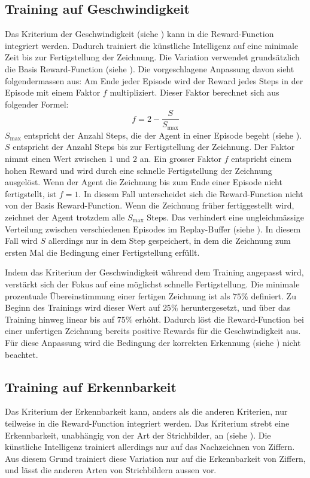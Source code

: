 \subsection{Training auf Geschwindigkeit}\label{sub:m_var_speed}
Das Kriterium der Geschwindigkeit (siehe ) kann in
die Reward-Function integriert werden. Dadurch trainiert die künstliche
Intelligenz auf eine minimale Zeit bis zur Fertigstellung der Zeichnung. Die
Variation verwendet grundsätzlich die Basis Reward-Function (siehe
). Die vorgeschlagene Anpassung davon sieht
folgendermassen aus: Am Ende jeder Episode wird der Reward jedes Steps in der
Episode mit einem Faktor $f$ multipliziert. Dieser Faktor berechnet sich aus
folgender Formel:
\[ f = 2 - \frac{S}{S_{\max}} \]
$S_{\max}$ entspricht der Anzahl Steps, die der Agent in einer Episode begeht
(siehe ). $S$ entspricht der Anzahl Steps bis zur
Fertigstellung der Zeichnung. Der Faktor nimmt einen Wert zwischen $1$ und $2$
an. Ein grosser Faktor $f$ entspricht einem hohen Reward und wird durch eine
schnelle Fertigstellung der Zeichnung ausgelöst. Wenn der Agent die Zeichnung
bis zum Ende einer Episode nicht fertigstellt, ist $f = 1$. In diesem Fall unterscheidet sich die
Reward-Function nicht von der Basis Reward-Function. Wenn die Zeichnung früher
fertiggestellt wird, zeichnet der Agent trotzdem alle $S_{\max}$ Steps. Das
verhindert eine ungleichmässige Verteilung zwischen verschiedenen Episodes im
Replay-Buffer (siehe ). In diesem Fall wird $S$
allerdings nur in dem Step gespeichert, in dem die Zeichnung zum ersten Mal die
Bedingung einer Fertigstellung erfüllt.  
 
Indem das Kriterium der Geschwindigkeit während dem Training angepasst wird,
verstärkt sich der Fokus auf eine möglichst schnelle Fertigstellung. Die
minimale prozentuale Übereinstimmung einer fertigen Zeichnung ist als $75\%$
definiert. Zu Beginn des Trainings wird dieser Wert auf $25\%$ heruntergesetzt,
und über das Training hinweg linear bis auf $75\%$ erhöht. Dadurch löst die
Reward-Function bei einer unfertigen Zeichnung bereits positive Rewards für die
Geschwindigkeit aus. Für diese Anpassung wird die Bedingung der korrekten
Erkennung (siehe ) nicht beachtet.
 
 
\subsection{Training auf Erkennbarkeit}\label{sub:m_var_rec}
Das Kriterium der Erkennbarkeit kann, anders als die anderen Kriterien, nur
teilweise in die Reward-Function integriert werden. Das Kriterium strebt eine
Erkennbarkeit, unabhängig von der Art der Strichbilder, an (siehe
). Die künstliche Intelligenz trainiert allerdings nur
auf das Nachzeichnen von Ziffern. Aus diesem Grund trainiert diese Variation nur
auf die Erkennbarkeit von Ziffern, und lässt die anderen Arten von Strichbildern
aussen vor.
 
